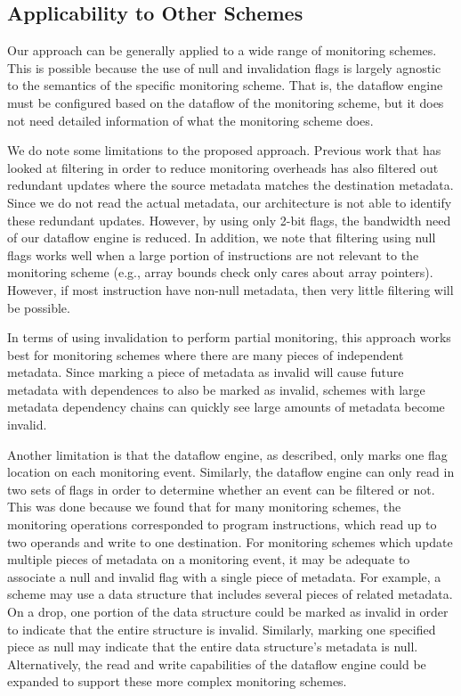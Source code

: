 \subsection{Applicability to Other Schemes}

Our approach can be generally applied to a wide range of monitoring schemes. This
is possible because the use of null and invalidation flags is largely agnostic
to the semantics of the specific monitoring scheme. That is, the dataflow
engine must be configured based on the dataflow of the monitoring scheme, but
it does not need detailed information of what the monitoring scheme does. 

We do note some limitations to the proposed approach. Previous work
\cite{fade-hpca14} that has looked at filtering in order to reduce monitoring
overheads has also filtered out redundant updates where the source metadata
matches the destination metadata. Since we do not read the actual metadata, our
architecture is not able to identify these redundant updates. However, by using
only 2-bit flags, the bandwidth need of our dataflow engine is reduced.  
In addition, we note that filtering using null flags works well when a large
portion of instructions are not relevant to the monitoring scheme (e.g., array
bounds check only cares about array pointers). However, if most instruction
have non-null metadata, then very little filtering will be possible. 

In terms of using invalidation to perform partial monitoring, this 
approach works best for monitoring schemes where there are many pieces of
independent metadata. Since marking a piece of metadata as invalid will cause
future metadata with dependences to also be marked as invalid, schemes with
large metadata dependency chains can quickly see large amounts of metadata
become invalid. 

Another limitation is that the dataflow engine, as described, only marks one
flag location on each monitoring event. Similarly, the dataflow engine can only
read in two sets of flags in order to determine whether an event can be
filtered or not. This was done because we found that for many monitoring
schemes, the monitoring operations corresponded to program instructions, which
read up to two operands and write to one destination. For monitoring schemes
which update multiple pieces of metadata on a monitoring event, it may be
adequate to associate a null and invalid flag with a single piece of metadata.  For
example, a scheme may use a data structure that includes several pieces of
related metadata. On a drop, one portion of the data structure could be marked as invalid in
order to indicate that the entire structure is invalid.  Similarly, marking one
specified piece as null may indicate that the entire data structure's metadata
is null.  Alternatively, the read and write capabilities of the dataflow
engine could be expanded to support these more complex monitoring schemes.
